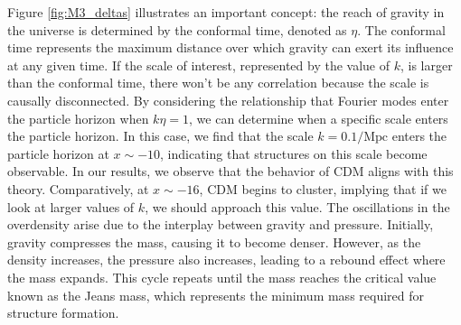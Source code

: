 \documentclass{aa}
\begin{document}
Figure \ref{fig:M3_deltas} illustrates an important concept: the reach of gravity in the universe is determined by the conformal time, denoted as $\eta$. The conformal time represents the maximum distance over which gravity can exert its influence at any given time. If the scale of interest, represented by the value of $k$, is larger than the conformal time, there won't be any correlation because the scale is causally disconnected. By considering the relationship that Fourier modes enter the particle horizon when $k\eta=1$, we can determine when a specific scale enters the particle horizon. In this case, we find that the scale $k=0.1/\mathrm{Mpc}$ enters the particle horizon at $x\sim -10$, indicating that structures on this scale become observable. In our results, we observe that the behavior of CDM aligns with this theory. Comparatively, at $x\sim -16$, CDM begins to cluster, implying that if we look at larger values of $k$, we should approach this value. The oscillations in the overdensity arise due to the interplay between gravity and pressure. Initially, gravity compresses the mass, causing it to become denser. However, as the density increases, the pressure also increases, leading to a rebound effect where the mass expands. This cycle repeats until the mass reaches the critical value known as the Jeans mass, which represents the minimum mass required for structure formation.
\end{document}
